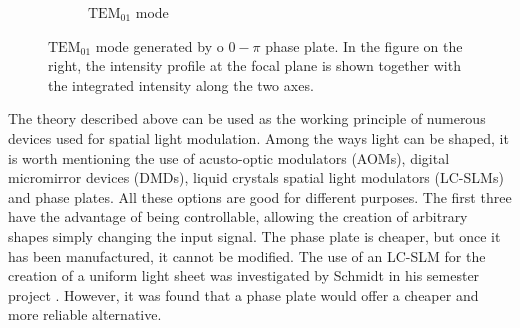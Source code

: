 \begin{figure}
\begin{subfigure}[t]{0.6\textwidth}
        \caption{$\text{TEM}_{01}$ mode}
        \label{fig:tem10}
    \end{subfigure}
    \caption{$\text{TEM}_{01}$ mode generated by o $0-\pi$ phase plate. In the figure on the right, the intensity profile at the focal plane is shown together with the integrated intensity along the two axes.}
    \label{fig:0pi}
\end{figure}
The theory described above can be used as the working principle of numerous devices used for spatial light modulation. Among the ways light can be shaped, it is worth mentioning the use of acusto-optic modulators (AOMs), digital micromirror devices (DMDs), liquid crystals spatial light modulators (LC-SLMs) and phase plates. All these options are good for different purposes. The first three have the advantage of being controllable, allowing the creation of arbitrary shapes simply changing the input signal. The phase plate is cheaper, but once it has been manufactured, it cannot be modified.
The use of an LC-SLM for the creation of a uniform light sheet was investigated by Schmidt in his semester project \cite{schmidt2021}. However, it was found that a phase plate would offer a cheaper and more reliable alternative.

